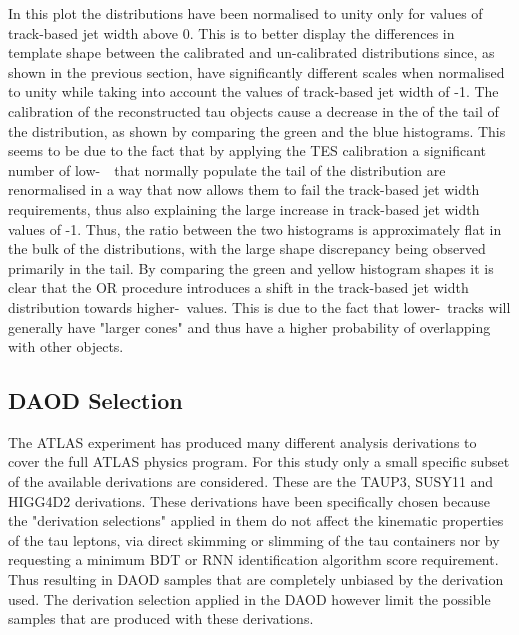 	In this plot the distributions have been normalised to unity only for values of track-based jet width above 0. This is to better display the differences in template shape between the calibrated and un-calibrated distributions since, as shown in the previous section, have significantly different scales when normalised to unity while taking into account the values of track-based jet width of -1. The calibration of the reconstructed tau objects cause a decrease in the of the tail of the distribution, as shown by comparing the green and the blue histograms. 
	This seems to be due to the fact that by applying the \ac{TES} calibration a significant number of low-\pt\ \htau\ that normally populate the tail of the distribution are renormalised in a way that now allows them to fail the track-based jet width requirements, thus also explaining the large increase in track-based jet width values of -1. 
	Thus, the ratio between the two histograms is approximately flat in the bulk of the distributions, with the large shape discrepancy being observed primarily in the tail.
	 By comparing the green and yellow histogram shapes it is clear that the \ac{OR} procedure introduces a shift in the track-based jet width distribution towards higher-\pt\ values. This is due to the fact that lower-\pt\ tracks will generally have "larger cones" and thus have a higher probability of overlapping with other objects. 
	
\subsection*{DAOD Selection}
	\label{sec:DAOD_selection}
	 The \ac{ATLAS} experiment has produced many different analysis derivations to cover the full \ac{ATLAS} physics program. 
	For this study only a small specific subset of the available derivations are considered. 
	These are the TAUP3, SUSY11 and HIGG4D2 derivations.
	These derivations have been specifically chosen because the "derivation selections" applied in them do not affect the kinematic properties of the tau leptons, via direct skimming or slimming of the tau containers nor by requesting a minimum \ac{BDT} or \ac{RNN} identification algorithm score requirement. 
	Thus resulting in \ac{DAOD} samples that are completely unbiased by the derivation used. 
	The derivation selection applied in the \ac{DAOD} however limit the possible samples that are produced with these derivations. 
	
